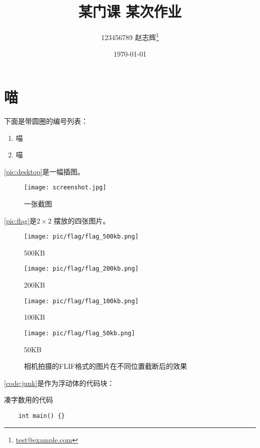 \documentclass{dreamClass}
\title{\heiti\textbf{某门课 \quad 某次作业}}
\author{123456789 赵志辉\thanks{\href{mailto:test@example.com}{test@example.com}}}
\affil{九乡河文理学院}
\date{\today}
\begin{document}
\maketitle
\thispagestyle{empty}

\section{喵}
下面是带圆圈的编号列表：
\begin{enumerate}[label=\large\protect\textcircled{\small\arabic*}]
    \item 喵
    \item 喵
\end{enumerate}

\autoref{pic:desktop}是一幅插图。
\begin{figure}
    \centering
    \texttt{[image: screenshot.jpg]}
    \caption{一张截图}\label{pic:desktop}
\end{figure}

\autoref{pic:flag}是\(2 \times 2\) 摆放的四张图片。
\begin{figure}
    \centering
    \begin{minipage}{.5\textwidth}
        \centering
        \texttt{[image: pic/flag/flag\_500kb.png]}
        \caption{500KB}
    \end{minipage}%
    \begin{minipage}{.5\textwidth}
        \centering
        \texttt{[image: pic/flag/flag\_200kb.png]}
        \caption{200KB}
    \end{minipage}

    \begin{minipage}{.5\textwidth}
        \centering
        \texttt{[image: pic/flag/flag\_100kb.png]}
        \caption{100KB}
    \end{minipage}%
    \begin{minipage}{.5\textwidth}
        \centering
        \texttt{[image: pic/flag/flag\_50kb.png]}
        \caption{50KB}
    \end{minipage}
    \caption{相机拍摄的FLIF格式的图片在不同位置截断后的效果\label{pic:flag}}
\end{figure}


\autoref{code:junk}是作为浮动体的代码块：
\begin{listing}
    \caption{凑字数用的代码\label{code:junk}}
    \begin{verbatim}
    int main() {}
    \end{verbatim}
\end{listing}
\end{document}
